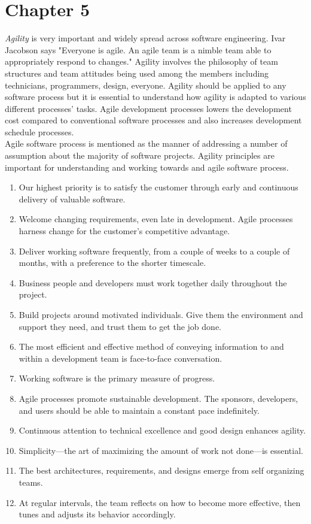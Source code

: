 \documentclass[12pt]{article}
\begin{document}
\section{Chapter 5}
\indent 
\emph{Agility} is very important and widely spread across software engineering. Ivar Jacobson says "Everyone is agile. An agile team is a nimble team able to appropriately respond to changes." Agility involves the philosophy of team structures and team attitudes being used among the members including technicians, programmers, design, everyone. Agility should be applied to any software process but it is essential to understand how agility is adapted to various different processes' tasks. Agile development processes lowers the development cost compared to conventional software processes and also increases development schedule processes.\\ 
\indent 
Agile software process is mentioned as the manner of addressing a number of assumption about the majority of software projects. Agility principles are important for understanding and working towards and agile software process.
    \begin{enumerate}
        \item Our highest priority is to satisfy the customer through early and continuous delivery of valuable software.
        \item Welcome changing requirements, even late in development. Agile processes harness change for the customer's competitive advantage.  
        \item Deliver working software frequently, from a couple of weeks to a couple of months, with a preference to the shorter timescale.  
        \item Business people and developers must work together daily throughout the project. 
        \item Build projects around motivated individuals. Give them the environment and support they need, and trust them to get the job done.  
        \item The most efficient and effective method of conveying information to and within a development team is face-to-face conversation.
        \item Working software is the primary measure of progress.
        \item Agile processes promote sustainable development. The sponsors, developers, and users should be able to maintain a constant pace indefinitely.  
        \item Continuous attention to technical excellence and good design enhances agility.  
        \item Simplicity—the art of maximizing the amount of work not done—is essential.  
        \item The best architectures, requirements, and designs emerge from self organizing teams.  
        \item At regular intervals, the team reflects on how to become more effective, then tunes and adjusts its behavior accordingly.  
    \end{enumerate}
\end{document}

